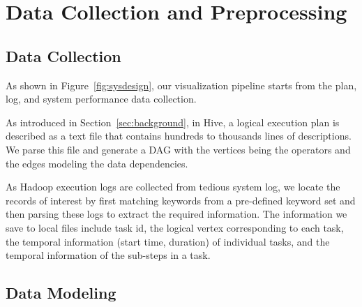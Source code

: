\section{Data Collection and Preprocessing}

\subsection{Data Collection}
%
%

As shown in Figure~\ref{fig:sysdesign}, our visualization pipeline starts from the plan, log, and system performance data collection.

As introduced in Section~\ref{sec:background}, in Hive, a logical execution plan is described as a text file that contains hundreds to thousands lines of descriptions. We parse this file and generate a DAG with the vertices being the operators and the edges modeling the data dependencies.

As Hadoop execution logs are collected from tedious system log, we locate the records of interest by first matching keywords from a pre-defined keyword set and then parsing these logs to extract the required information. The information we save to local files include task id, the logical vertex corresponding to each task, the temporal information (start time, duration) of individual tasks, and the temporal information of the sub-steps in a task. 


\subsection{Data Modeling}


